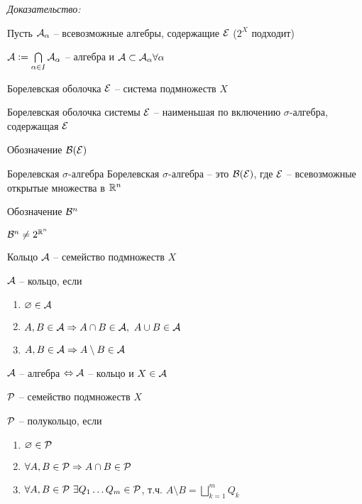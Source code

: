 \documentclass[12pt]{article}
\begin{document}
\textit{Доказательство:}

Пусть $\A_\alpha$ -- всевозможные алгебры, содержащие $\E$ ($2^X$ подходит)

$\A := \bigcap\limits_{\alpha \in I} \A_\alpha$ -- алгебра и $\A \subset \A_\alpha \forall \alpha$

\newpage

\begin{defin}{Борелевская оболочка}
    $\E$ -- система подмножеств $X$

    Борелевская оболочка системы $\E$ -- наименьшая по включению $\sigma$-алгебра, содержащая $\E$
\end{defin}

\begin{declar}{Обозначение}
    $\B(\E)$
\end{declar}

\begin{defin}{Борелевская $\sigma$-алгебра}
    Борелевская $\sigma$-алгебра -- это $\B(\E)$, где $\E$ -- всевозможные открытые множества в $\R^n$
\end{defin}

\begin{declar}{Обозначение}
    $\B^n$
\end{declar}

\begin{Remark}{}
    $\B^n \neq 2^{\R^n}$
\end{Remark}

\begin{defin}{Кольцо}
    $\A$ -- семейство подмножеств $X$

    $\A$ -- кольцо, если 
    
    \begin{enumerate}
        \item $\varnothing \in \A$
        \item $A, B \in \A \Rightarrow A \cap B \in \A,\ A \cup B \in \A$
        \item $A, B \in \A \Rightarrow A \setminus B \in \A$
    \end{enumerate}
\end{defin}

\begin{Remark}{}
    $\A$ -- алгебра $\Leftrightarrow \A$ -- кольцо и $X \in \A$
\end{Remark}

\begin{defin}{}
    $\P$ -- семейство подмножеств $X$

    $\P$ -- полукольцо, если 

    \begin{enumerate}
        \item $\varnothing \in \P$
        \item $\forall A, B \in \P \Rightarrow A \cap B \in \P$
        \item $\forall A, B \in \P\ \exists Q_1 \ldots Q_m \in \P$, т.ч. $A \setminus B = \bigsqcup\limits_{k = 1}^m Q_k$
    \end{enumerate}
\end{defin}
\end{document}
